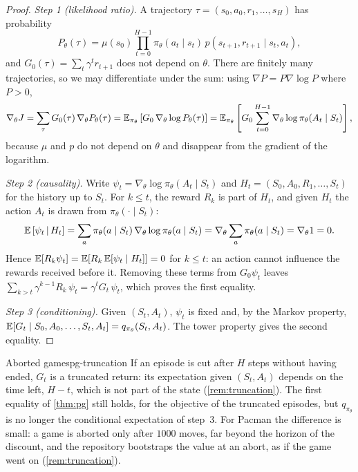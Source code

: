 \begin{proof}
  \emph{Step 1 (likelihood ratio).} A trajectory $\tau = (s_0, a_0, r_1,
  \dots, s_H)$ has probability
  \begin{equation*}
    P_\theta(\tau) = \mu(s_0) \prod_{t=0}^{H-1} \pi_\theta(a_t \mid s_t)\,
    p(s_{t+1}, r_{t+1} \mid s_t, a_t),
  \end{equation*}
  and $G_0(\tau) = \sum_{t} \gamma^t r_{t+1}$ does not depend on $\theta$.
  There are finitely many trajectories, so we may differentiate under the
  sum: using $\nabla P = P \nabla \log P$ where $P > 0$,
  \begin{equation*}
    \nabla_\theta J = \sum_\tau G_0(\tau)\, \nabla_\theta P_\theta(\tau)
    = \mathbb{E}_{\pi_\theta}\left[ G_0\, \nabla_\theta \log P_\theta(\tau)
    \right]
    = \mathbb{E}_{\pi_\theta}\left[ G_0 \sum_{t=0}^{H-1} \nabla_\theta \log
    \pi_\theta(A_t \mid S_t) \right],
  \end{equation*}
  because $\mu$ and $p$ do not depend on $\theta$ and disappear from the
  gradient of the logarithm.

  \emph{Step 2 (causality).} Write $\psi_t = \nabla_\theta \log
  \pi_\theta(A_t \mid S_t)$ and $H_t = (S_0, A_0, R_1, \dots, S_t)$ for the
  history up to $S_t$. For $k \leq t$, the reward $R_k$ is part of $H_t$,
  and given $H_t$ the action $A_t$ is drawn from $\pi_\theta(\cdot \mid S_t)$:
  \begin{equation*}
    \mathbb{E}\left[\psi_t \,\middle|\, H_t\right] = \sum_a \pi_\theta(a \mid
    S_t)\, \nabla_\theta \log \pi_\theta(a \mid S_t) = \nabla_\theta \sum_a
    \pi_\theta(a \mid S_t) = \nabla_\theta 1 = 0.
  \end{equation*}
  Hence $\mathbb{E}[R_k \psi_t] = \mathbb{E}[R_k\, \mathbb{E}[\psi_t \mid H_t]] = 0$ for
  $k \leq t$: an action cannot influence the
  rewards received before it. Removing these terms from $G_0 \psi_t$ leaves
  $\sum_{k > t} \gamma^{k-1} R_k\, \psi_t = \gamma^t G_t\, \psi_t$, which
  proves the first equality.

  \emph{Step 3 (conditioning).} Given $(S_t, A_t)$, $\psi_t$ is fixed and,
  by the Markov property, $\mathbb{E}[G_t \mid S_0, A_0, \dots, S_t, A_t] =
  q_{\pi_\theta}(S_t, A_t)$. The tower property gives the second equality.
\end{proof}

\begin{remark}{Aborted games}{pg-truncation}
  If an episode is cut after $H$ steps without having ended, $G_t$ is a
  truncated return: its expectation given $(S_t, A_t)$ depends on the time
  left, $H - t$, which is not part of the state (\cref{rem:truncation}).
  The first equality of \cref{thm:pg} still holds, for the objective of the
  truncated episodes, but $q_{\pi_\theta}$ is no longer the conditional
  expectation of step~3. For Pacman the difference is small: a game is
  aborted only after $1000$ moves, far beyond the horizon of the discount,
  and the repository bootstraps the value at an abort, as if the game went
  on (\cref{rem:truncation}).
\end{remark}

